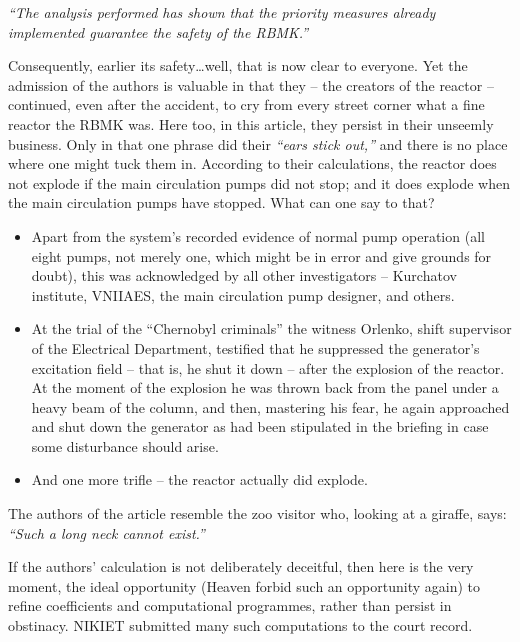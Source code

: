 \documentclass[openright]{bookest}
\begin{document}
\begin{personal}
\textit{``The analysis performed has shown that the priority measures already implemented guarantee the safety of the RBMK.''}
\end{personal}

Consequently, earlier its safety\ldots well, that is now clear to everyone. Yet the admission of the authors is valuable in that they -- the creators of the reactor -- continued, even after the accident, to cry from every street corner what a fine reactor the RBMK was. Here too, in this article, they persist in their unseemly business. Only in that one phrase did their \textit{``ears stick out,''} and there is no place where one might tuck them in. According to their calculations, the reactor does not explode if the main circulation pumps did not stop; and it does explode when the main circulation pumps have stopped. What can one say to that?

\begin{itemize}
\item Apart from the system's recorded evidence of normal pump operation (all eight pumps, not merely one, which might be in error and give grounds for doubt), this was acknowledged by all other investigators -- Kurchatov institute, VNIIAES, the main circulation pump designer, and others.
\item At the trial of the ``Chernobyl criminals'' the witness Orlenko, shift supervisor of the Electrical Department, testified that he suppressed the generator's excitation field -- that is, he shut it down -- after the explosion of the reactor. At the moment of the explosion he was thrown back from the panel under a heavy beam of the column, and then, mastering his fear, he again approached and shut down the generator as had been stipulated in the briefing in case some disturbance should arise.
\item And one more trifle -- the reactor actually did explode.
\end{itemize}

The authors of the article resemble the zoo visitor who, looking at a giraffe, says: \textit{``Such a long neck cannot exist.''}

If the authors' calculation is not deliberately deceitful, then here is the very moment, the ideal opportunity (Heaven forbid such an opportunity again) to refine coefficients and computational programmes, rather than persist in obstinacy. NIKIET submitted many such computations to the court record.
\end{document}
